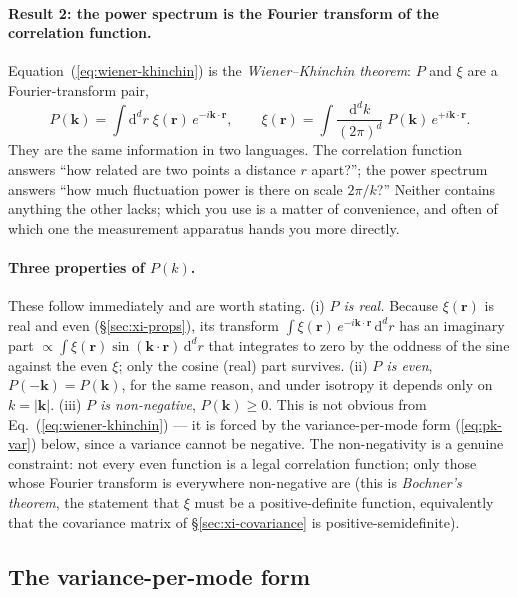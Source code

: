 \documentclass[12pt]{article}
\newcommand{\bk}{\mathbf{k}}
\newcommand{\br}{\mathbf{r}}
\begin{document}
\paragraph{Result 2: the power spectrum is the Fourier transform of the
correlation function.}  Equation~(\ref{eq:wiener-khinchin}) is the
\emph{Wiener--Khinchin theorem}: $P$ and $\xi$ are a Fourier-transform
pair,
\begin{equation}
  P(\bk) = \int \mathrm d^d r\;\xi(\br)\,e^{-i\bk\cdot\br},
  \qquad
  \xi(\br) = \int \frac{\mathrm d^d k}{(2\pi)^d}\;P(\bk)\,e^{+i\bk\cdot\br}.
  \label{eq:P-xi-pair}
\end{equation}
They are the same information in two languages.  The correlation
function answers ``how related are two points a distance $r$ apart?'';
the power spectrum answers ``how much fluctuation power is there on
scale $2\pi/k$?''  Neither contains anything the other lacks; which you
use is a matter of convenience, and often of which one the measurement
apparatus hands you more directly.

\paragraph{Three properties of $P(k)$.}  These follow immediately and are
worth stating.  (i) \emph{$P$ is real.}  Because $\xi(\br)$ is real and
even (\S\ref{sec:xi-props}), its transform
$\int \xi(\br)\,e^{-i\bk\cdot\br}\,\mathrm d^d r$ has an imaginary part
$\propto \int \xi(\br)\sin(\bk\cdot\br)\,\mathrm d^d r$ that integrates to
zero by the oddness of the sine against the even $\xi$; only the cosine
(real) part survives.  (ii) \emph{$P$ is even}, $P(-\bk) = P(\bk)$, for
the same reason, and under isotropy it depends only on $k = |\bk|$.
(iii) \emph{$P$ is non-negative}, $P(\bk) \ge 0$.  This is not obvious
from Eq.~(\ref{eq:wiener-khinchin}) --- it is forced by the
variance-per-mode form (\ref{eq:pk-var}) below, since a variance cannot
be negative.  The non-negativity is a genuine constraint: not every even
function is a legal correlation function; only those whose Fourier
transform is everywhere non-negative are (this is \emph{Bochner's
theorem}, the statement that $\xi$ must be a positive-definite function,
equivalently that the covariance matrix of \S\ref{sec:xi-covariance} is
positive-semidefinite).

\subsection{The variance-per-mode form}
\label{sec:pk-variance}
\end{document}
